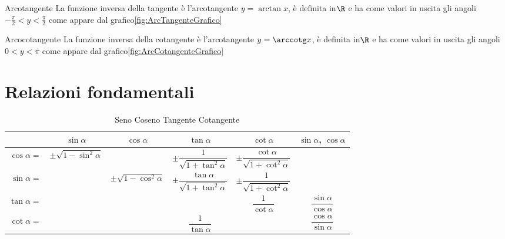 \begin{definizionet}{Arcotangente}{}
La funzione inversa della tangente è l'arcotangente $y=\arctan x$, è definita in$\R$ e ha come valori in uscita gli angoli $-\frac{\pi}{2}<y<\frac{\pi}{2}$ come appare dal grafico\nobs\vref{fig:ArcTangenteGrafico}
\end{definizionet}
\begin{definizionet}{Arcocotangente}{}
	La funzione inversa della cotangente è l'arcotangente $y=\arccotg x$, è definita in$\R$ e ha come valori in uscita gli angoli $0<y<\pi$ come appare dal grafico\nobs\vref{fig:ArcCotangenteGrafico}
\end{definizionet}
\section{Relazioni fondamentali}
\label{sec:RelazioniFondamentali}
\begin{table} %
	\centering
	\renewcommand{\arraystretch}{2}
	\begin{tabular}{rccccc}
	\toprule
	& $\sin\alpha$ &$\cos\alpha$&$\tan\alpha$ &$\cot\alpha$ & $\sin\alpha$, $\cos\alpha$ \\[.6cm]
	\midrule
	$\cos\alpha={}$& $\pm\sqrt{1-\sin^2\alpha}$ & &$\pm\dfrac{1}{\sqrt{1+\tan^2\alpha}}$ &$\pm\dfrac{\cot\alpha}{\sqrt{1+\cot^2\alpha}}$ & \\ [.6cm]
	$\sin\alpha={}$& & $\pm\sqrt{1-\cos^2\alpha}$ &$\pm\dfrac{\tan\alpha}{\sqrt{1+\tan^2\alpha}}$ &$\pm\dfrac{1}{\sqrt{1+\cot^2\alpha}}$ & \\ [.6cm]
	$\tan\alpha={}$& & & & $\dfrac{1}{\cot\alpha}$ &$\dfrac{\sin\alpha}{\cos\alpha}$\\ [.6cm]
	$\cot\alpha={}$& & &$\dfrac{1}{\tan\alpha}$ & &$\dfrac{\cos\alpha}{\sin\alpha}$\\[.6cm] 
	\bottomrule
	\end{tabular}
	\caption{Seno Coseno Tangente Cotangente}
	\label{tab:SenoCosenoTangenteCotangente}
\end{table}
\renewcommand{\arraystretch}{1}
